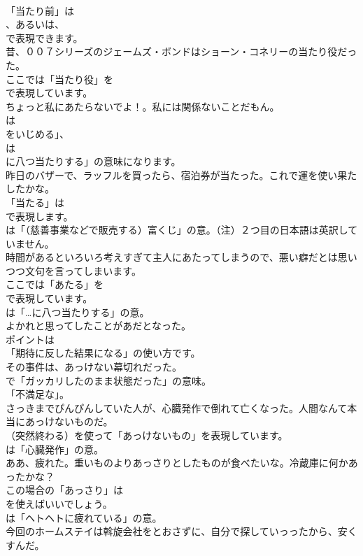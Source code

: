 \documentclass[8pt]{extreport}
\begin{document}
\begin{CJK}{UTF8}{min}
\\	「当たり前」は 
\\	、あるいは、
\\	で表現できます。	
\\	昔、００７シリーズのジェームズ・ボンドはショーン・コネリーの当たり役だった。 
\\	ここでは「当たり役」を 
\\	で表現しています。	
\\	ちょっと私にあたらないでよ！。私には関係ないことだもん。 
\\	は
\\	をいじめる」、
\\	は
\\	に八つ当たりする」の意味になります。	
\\	昨日のバザーで、ラッフルを買ったら、宿泊券が当たった。これで運を使い果たしたかな。 
\\	「当たる」は 
\\	で表現します。
\\	は「（慈善事業などで販売する）富くじ」の意。（注）２つ目の日本語は英訳していません。	
\\	時間があるといろいろ考えすぎて主人にあたってしまうので、悪い癖だとは思いつつ文句を言ってしまいます。 
\\	ここでは「あたる」を 
\\	で表現しています。
\\	は「…に八つ当たりする」の意。	
\\	よかれと思ってしたことがあだとなった。 
\\	ポイントは
\\	「期待に反した結果になる」の使い方です。	
\\	その事件は、あっけない幕切れだった。 
\\	で「ガッカリしたのまま状態だった」の意味。
\\	「不満足な」。	
\\	さっきまでぴんぴんしていた人が、心臓発作で倒れて亡くなった。人間なんて本当にあっけないものだ。 
\\	（突然終わる）を使って「あっけないもの」を表現しています。
\\	は「心臓発作」の意。	
\\	ああ、疲れた。重いものよりあっさりとしたものが食べたいな。冷蔵庫に何かあったかな？ 
\\	この場合の「あっさり」は
\\	を使えばいいでしょう。
\\	は「ヘトヘトに疲れている」の意。	
\\	今回のホームステイは斡旋会社をとおさずに、自分で探していっったから、安くすんだ。 

\end{CJK}
\end{document}
